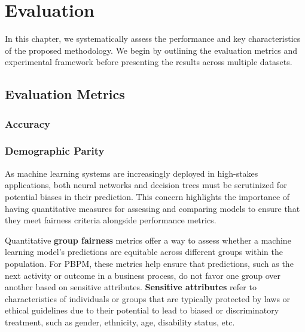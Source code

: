 %
\chapter{Evaluation}
In this chapter, we systematically assess the performance and key characteristics of the proposed methodology.
We begin by outlining the evaluation metrics and experimental framework before presenting the results across multiple datasets.

\section{Evaluation Metrics}

\subsection{Accuracy}

\subsection{Demographic Parity}
As machine learning systems are increasingly deployed in high-stakes applications,
both neural networks and decision trees must be scrutinized for potential biases in their prediction.
This concern highlights the importance of having quantitative measures
for assessing and comparing models to ensure that they meet fairness criteria
alongside performance metrics.

Quantitative \textbf{group fairness} metrics offer a way to assess whether a machine learning model's predictions
are equitable across different groups within the population.
For PBPM, these metrics help ensure that predictions, such as the next activity or outcome in a business process,
do not favor one group over another based on sensitive attributes.
\textbf{Sensitive attributes} refer to characteristics of individuals or groups
that are typically protected by laws or ethical guidelines due to their potential to lead to biased or discriminatory treatment,
such as gender, ethnicity, age, disability status, etc.

